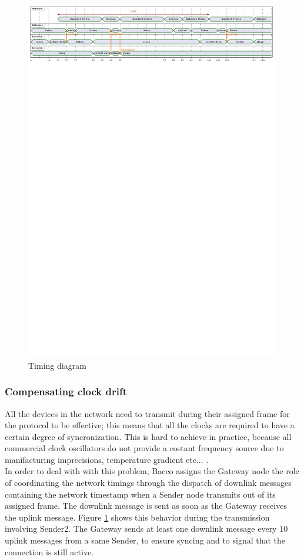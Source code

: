 \begin{figure}
    \centering
    \includegraphics[clip, trim=0cm 25.2cm 0cm 0cm, width=1.0\textwidth]{uml/timings.pdf}
    \caption{Timing diagram}
    \label{timing diagram}
\end{figure}

\subsubsection{Compensating clock drift}
All the devices in the network need to transmit during their assigned frame for the protocol to be effective; this means
that all the clocks are required to have a certain degree of syncronization. This is hard to achieve in
practice, because all commercial clock oscillators do not provide a costant frequency source due to manifacturing imprecisions,
temperature gradient etc... .\\
In order to deal with with this problem, Bacco assigns the Gateway node the role of coordinating the network timings through
the dispatch of downlink messages containing the network timestamp when a Sender
node transmits out of its assigned frame. The downlink message is sent as soon as the Gateway receives the uplink
message. Figure \ref{timing diagram} shows this behavior during the transmission involving Sender2.
The Gateway sends at least one downlink message every 10 uplink messages from a same Sender, to ensure syncing and to
signal that the connection is still active.

